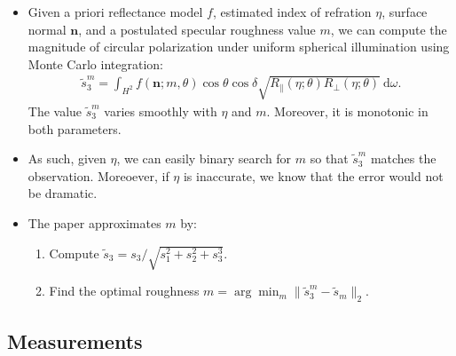 \documentclass[10pt]{article}
\newcommand{\dee}{\mathrm{d}}
\newcommand{\ve}[1]{\mathbf{#1}}
\begin{document}
    \begin{itemize}
      \item Given a priori reflectance model $f$, estimated index of refration $\eta$, surface normal $\ve{n}$, and a postulated specular roughness value $m$, we can compute the magnitude of circular polarization under uniform spherical illumination using Monte Carlo integration:
      \begin{align*}
        \tilde{s}_3^m = \int_{H^2} f(\ve{n}; m, \theta) \cos\theta \cos\delta \sqrt{R_\parallel(\eta;\theta) R_\perp(\eta;\theta)}\ \dee\omega.
      \end{align*}
      The value $\tilde{s}_3^m$ varies smoothly with $\eta$ and $m$.  Moreover, it is monotonic in both parameters.  

      \item As such, given $\eta$, we can easily binary search for $m$ so that $\tilde{s}_3^m$ matches the observation.  Moreoever, if $\eta$ is inaccurate, we know that the error would not be dramatic.

      \item The paper approximates $m$ by:
      \begin{enumerate}
        \item Compute $\tilde{s}_3 = s_3 / \sqrt{s_1^2 + s_2^2 + s_3^3}$.
        \item Find the optimal roughness $m = \arg\min_m \| \tilde{s}_3^m - \tilde{s}_m \|_2$.
      \end{enumerate}
    \end{itemize}

    \subsection{Measurements}
\end{document}
